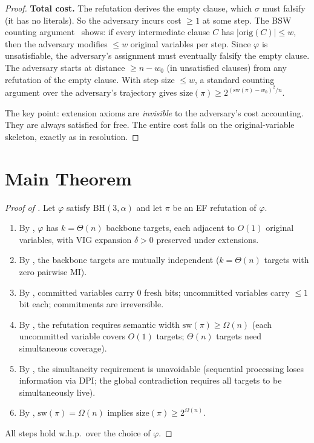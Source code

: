 \documentclass[11pt]{article}
\theoremstyle{definition}
\newcommand{\size}{\mathrm{size}}
\begin{document}
\begin{proof}
\textbf{Total cost.}  The refutation derives the empty clause, which
$\sigma$ must falsify (it has no literals).  So the adversary incurs
cost $\geq 1$ at some step.  The BSW counting
argument~\cite{BenSasson2001} shows: if every intermediate clause $C$
has $|\mathrm{orig}(C)| \leq w$, then the adversary modifies $\leq w$
original variables per step.  Since $\varphi$ is unsatisfiable, the
adversary's assignment must eventually falsify the empty clause.
The adversary starts at distance $\geq n - w_0$ (in unsatisfied
clauses) from any refutation of the empty clause.  With step size
$\leq w$, a standard counting argument over the adversary's
trajectory gives $\size(\pi) \geq 2^{(\mathrm{sw}(\pi) - w_0)^2/n}$.

The key point: extension axioms are \emph{invisible} to the adversary's
cost accounting.  They are always satisfied for free.  The entire
cost falls on the original-variable skeleton, exactly as in resolution.
\end{proof}

\section{Main Theorem}\label{sec:main}

\begin{proof}[Proof of ]
Let $\varphi$ satisfy $\mathrm{BH}(3, \alpha)$ and let $\pi$ be an EF
refutation of $\varphi$.

\begin{enumerate}
\item By , $\varphi$ has $k = \Theta(n)$ backbone
targets, each adjacent to $O(1)$ original variables, with VIG expansion
$\delta > 0$ preserved under extensions.

\item By , the backbone targets are mutually
independent ($k = \Theta(n)$ targets with zero pairwise MI).

\item By , committed variables carry $0$ fresh bits;
uncommitted variables carry $\leq 1$ bit each; commitments are
irreversible.

\item By , the refutation requires semantic width
$\mathrm{sw}(\pi) \geq \Omega(n)$ (each uncommitted variable covers
$O(1)$ targets; $\Theta(n)$ targets need simultaneous coverage).

\item By , the simultaneity requirement is
unavoidable (sequential processing loses information via DPI; the
global contradiction requires all targets to be simultaneously live).

\item By , $\mathrm{sw}(\pi) = \Omega(n)$ implies
$\size(\pi) \geq 2^{\Omega(n)}$.
\end{enumerate}

All steps hold w.h.p.\ over the choice of $\varphi$.
\end{proof}
\end{document}
